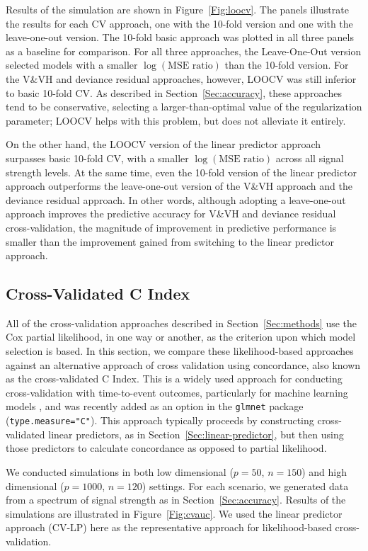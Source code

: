 Results of the simulation are shown in Figure~\ref{Fig:loocv}. The panels illustrate the results for each CV approach, one with the 10-fold version and one with the leave-one-out version. The 10-fold basic approach was plotted in all three panels as a baseline for comparison.  For all three approaches, the Leave-One-Out version selected models with a smaller $\log(\text{MSE ratio})$ than the 10-fold version. For the V\&VH and deviance residual approaches, however, LOOCV was still inferior to basic 10-fold CV.  As described in Section~\ref{Sec:accuracy}, these approaches tend to be conservative, selecting a larger-than-optimal value of the regularization parameter; LOOCV helps with this problem, but does not alleviate it entirely.

On the other hand, the LOOCV version of the linear predictor approach surpasses basic 10-fold CV, with a smaller $\log(\text{MSE ratio})$ across all signal strength levels. At the same time, even the 10-fold version of the linear predictor approach outperforms the leave-one-out version of the V\&VH approach and the deviance residual approach. In other words, although adopting a leave-one-out approach improves the predictive accuracy for V\&VH and deviance residual cross-validation, the magnitude of improvement in predictive performance is smaller than the improvement gained from switching to the linear predictor approach.

\subsection {Cross-Validated C Index}
\label{Sec:CIndex}

All of the cross-validation approaches described in Section~\ref{Sec:methods} use the Cox partial likelihood, in one way or another, as the criterion upon which model selection is based.  In this section, we compare these likelihood-based approaches against an alternative approach of cross validation using concordance, also known as the cross-validated C Index.  This is a widely used approach for conducting cross-validation with time-to-event outcomes, particularly for machine learning models \citep{Subramanian2011,Simon2011a}, and was recently added as an option in the \texttt{glmnet} package (\texttt{type.measure="C"}). This approach typically proceeds by constructing cross-validated linear predictors, as in Section~\ref{Sec:linear-predictor}, but then using those predictors to calculate concordance as opposed to partial likelihood.

We conducted simulations in both low dimensional ($p = 50$, $n = 150$) and high dimensional ($p = 1000$, $n = 120$) settings. For each scenario, we generated data from a spectrum of signal strength as in Section~\ref{Sec:accuracy}. Results of the simulations are illustrated in Figure~\ref{Fig:cvauc}.  We used the linear predictor approach (CV-LP) here as the representative approach for likelihood-based cross-validation.

